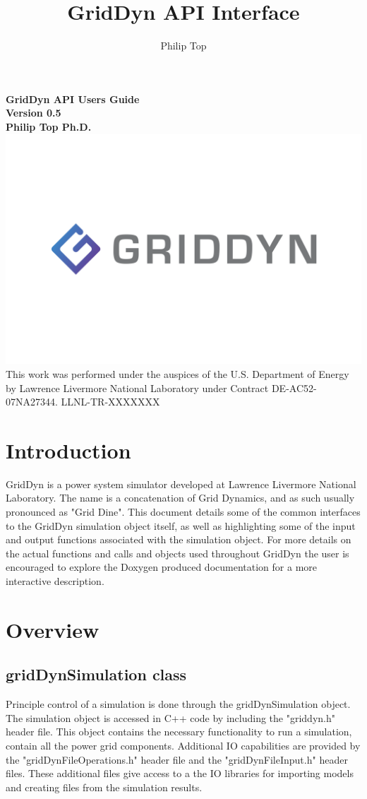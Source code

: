 \documentclass[12pt]{article} %
\title{GridDyn API Interface}
\author{Philip Top}
\date{} %
\date{\displaydate{date}}
\begin{document}
\begin{titlepage}
		\centering
		\vfill
		{\bfseries\Large
			GridDyn API Users Guide\\
			Version 0.5\\
			\vskip2cm
			Philip Top Ph.D.\\
		}    
		\vfill
		\includegraphics[width=\linewidth]{../images/GridDyn_FullColor.png}
		\vfill
		This work was performed under the auspices of the U.S. Department of Energy by
		Lawrence Livermore National Laboratory under Contract DE-AC52-07NA27344.
		LLNL-TR-XXXXXXX
		\vfill
\end{titlepage}

\newpage
\tableofcontents
\section{Introduction}

GridDyn is a power system simulator developed at Lawrence Livermore National Laboratory. The name is a concatenation of Grid Dynamics, and as such usually pronounced as "Grid Dine".   This document details some of the common interfaces to the GridDyn simulation object itself, as well as highlighting some of the input and output functions associated with the simulation object.  For more details on the actual functions and calls and objects used throughout GridDyn the user is encouraged to explore the Doxygen produced documentation for a more interactive description.  

\section{Overview}
\subsection{gridDynSimulation class}
Principle control of a simulation is done through the  gridDynSimulation object.  The simulation object is accessed in C++ code by including the "griddyn.h" header file.  This object contains the necessary functionality to run a simulation, contain all the power grid components. Additional IO capabilities are provided by the "gridDynFileOperations.h" header file and the "gridDynFileInput.h" header files.  These additional files give access to a the IO libraries for importing models and creating files from the simulation results.  
\end{document}
